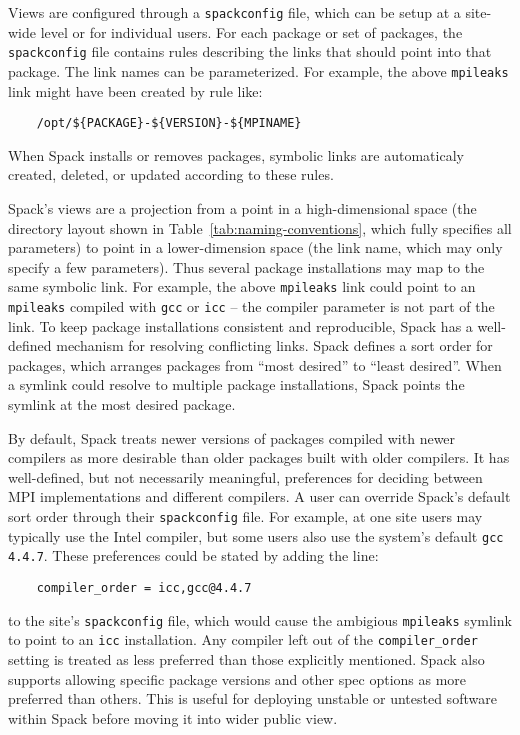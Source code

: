 Views are configured through a {\tt spackconfig} file, which can be setup at a site-wide level or for individual users.  For each package or set of packages, the {\tt spackconfig} file contains rules describing the links that should point into that package.  The link names can be parameterized.  For example, the above {\tt mpileaks} link might have been created by rule like:
%
\begin{verbatim}
    /opt/${PACKAGE}-${VERSION}-${MPINAME}
\end{verbatim}
%
When Spack installs or removes packages, symbolic links are automaticaly created, deleted, or updated according to these rules.  

Spack's views are a projection from a point in a high-dimensional space (the directory layout shown in Table~\ref{tab:naming-conventions}, which fully specifies all parameters) to point in a lower-dimension space (the link name, which may only specify a few parameters).  Thus several package installations may map to the same symbolic link.  For example, the above {\tt mpileaks} link could point to an {\tt mpileaks} compiled with {\tt gcc} or {\tt icc} -- the compiler parameter is not part of the link.  To keep  package installations  consistent and reproducible, Spack has a well-defined mechanism for resolving conflicting links.  Spack defines a sort order for packages, which arranges packages from ``most desired'' to ``least desired''.  When a symlink could resolve to multiple package installations, Spack points the symlink at the most desired package.  

By default, Spack treats newer versions of packages compiled with newer compilers as more desirable than older packages built with older compilers.  It has well-defined, but not necessarily meaningful, preferences for deciding between MPI implementations and different compilers.  A user can override Spack's default sort order through their {\tt spackconfig} file.  For example, at one site users may typically use the Intel compiler, but some users also use the system's default {\tt gcc 4.4.7}.  These preferences could be stated by adding the line:
%
\begin{verbatim}
    compiler_order = icc,gcc@4.4.7
\end{verbatim}
%
to the site's {\tt spackconfig} file, which would cause the ambigious {\tt mpileaks} symlink to point to an {\tt icc} installation.  Any compiler left out of the {\tt compiler\_order} setting is treated as less preferred than those explicitly mentioned.  Spack also supports allowing specific package versions and other spec options as more preferred than others.  This is useful for deploying unstable or untested software within Spack before moving it into wider public view.  


